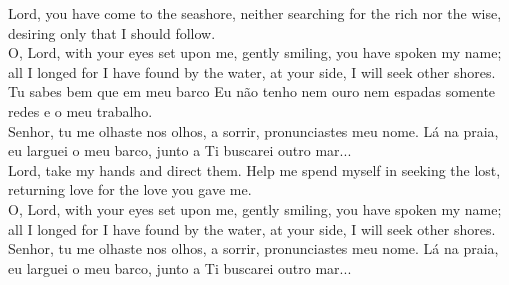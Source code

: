 \documentclass[10pt,a5]{article}
\begin{document}
Lord, you have come to the seashore,
neither searching for the rich nor the wise,
desiring only that I should follow.\\

O, Lord, with your eyes set upon me,
gently smiling, you have spoken my name;
all I longed for I have found by the water,
at your side, I will seek other shores.\\

Tu sabes bem que em meu barco
Eu não tenho nem ouro nem espadas
somente redes e o meu trabalho.\\

Senhor, tu me olhaste nos olhos,
a sorrir, pronunciastes meu nome.
Lá na praia, eu larguei o meu barco,
junto a Ti buscarei outro mar...\\

Lord, take my hands and direct them.
Help me spend myself
in seeking the lost,
returning love for the love you gave me.\\

O, Lord, with your eyes set upon me,
gently smiling, you have spoken my name;
all I longed for I have found by the water,
at your side, I will seek other shores.\\

Senhor, tu me olhaste nos olhos,
a sorrir, pronunciastes meu nome.
Lá na praia, eu larguei o meu barco,
junto a Ti buscarei outro mar...\\
\end{document}
